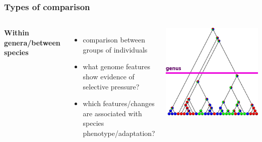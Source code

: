%
\begin{frame}
  \frametitle{Types of comparison}
    \begin{columns}[T] 
        \textcolor{RawSienna}{\textbf{Within genera/between species}}
        \begin{itemize}
	  \item comparison between groups of individuals
	  \item \textcolor{hutton_green}{what genome features show evidence of selective pressure?}
	  \item \textcolor{hutton_blue}{which features/changes are associated with species phenotype/adaptation?}      
        \end{itemize}
        \includegraphics[width=\textwidth]{images/cladogram_genus}
    \end{columns}  
\end{frame}

